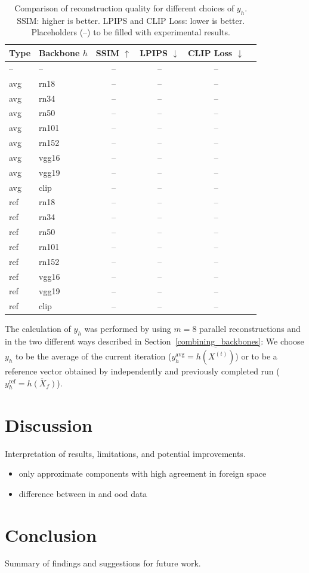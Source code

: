 \documentclass[10pt,twocolumn]{article}
\begin{document}
\begin{table}[ht]
    \centering
    \begin{tabular}{l l c c c c}
        \hline
        Type & Backbone $h$ & SSIM $\uparrow$ & LPIPS $\downarrow$ & CLIP Loss $\downarrow$ \\
        \hline
        -- & -- & -- & -- & -- \\
        avg & rn18 & -- & -- & -- \\
        avg & rn34 & -- & -- & -- \\
        avg & rn50 & -- & -- & -- \\
        avg & rn101 & -- & -- & -- \\
        avg & rn152 & -- & -- & -- \\
        avg & vgg16 & -- & -- & -- \\
        avg & vgg19 & -- & -- & -- \\
        avg & clip & -- & -- & -- \\
        ref & rn18 & -- & -- & -- \\
        ref & rn34 & -- & -- & -- \\
        ref & rn50 & -- & -- & -- \\
        ref & rn101 & -- & -- & -- \\
        ref & rn152 & -- & -- & -- \\
        ref & vgg16 & -- & -- & -- \\
        ref & vgg19 & -- & -- & -- \\
        ref & clip & -- & -- & -- \\
        \hline
    \end{tabular}
    \caption{
        Comparison of reconstruction quality for different choices of $y_h$.
        SSIM: higher is better.
        LPIPS and CLIP Loss: lower is better.
        Placeholders (--) to be filled with experimental results.
    }
    \label{tab:results_comparison}
\end{table}

The calculation of $y_h$ was performed by using $m=8$ parallel reconstructions and in the two different ways described in Section~\ref{combining_backbones}:
We choose $y_h$ to be the average of the current iteration ($y_h^\text{avg}=\overline{h(X^{(t)})}$) or to be a reference vector obtained by independently and previously completed run ($y_h^\text{ref}=\overline{h(X_f)}$).

\section{Discussion}
Interpretation of results, limitations, and potential improvements.
\begin{itemize}
    \item only approximate components with high agreement in foreign space
    \item difference between in and ood data
\end{itemize}

\section{Conclusion}
Summary of findings and suggestions for future work.



\end{document}
